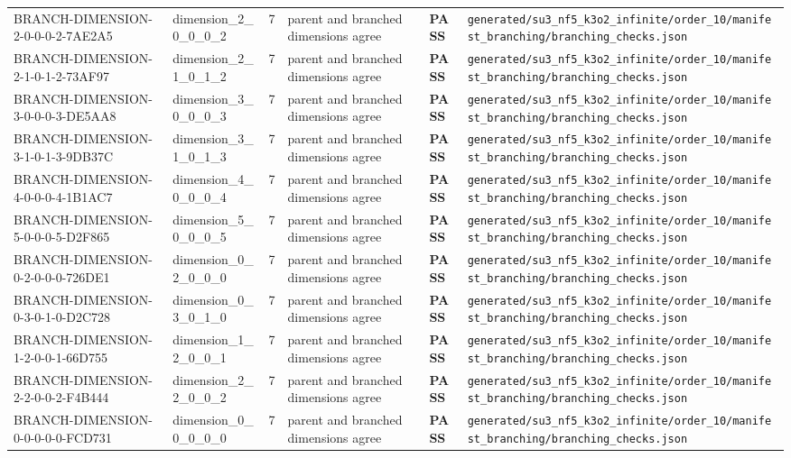 \documentclass[11pt]{article}
\newcommand{\Pass}{\textcolor{green!50!black}{\textbf{PASS}}}
\newcommand{\RawPath}[1]{\texttt{#1}}
\begin{document}
\begin{longtable}{p{3cm}p{2.5cm}r p{3cm}l p{2cm}}
BRANCH-DIMENSION-2-0-0-0-2-7AE2A5 & dimension\_2\_0\_0\_0\_2 & 7 & parent and branched dimensions agree & \Pass & \RawPath{generated/su3\_nf5\_k3o2\_infinite/order\_10/manifest\_branching/branching\_checks.json}\\
BRANCH-DIMENSION-2-1-0-1-2-73AF97 & dimension\_2\_1\_0\_1\_2 & 7 & parent and branched dimensions agree & \Pass & \RawPath{generated/su3\_nf5\_k3o2\_infinite/order\_10/manifest\_branching/branching\_checks.json}\\
BRANCH-DIMENSION-3-0-0-0-3-DE5AA8 & dimension\_3\_0\_0\_0\_3 & 7 & parent and branched dimensions agree & \Pass & \RawPath{generated/su3\_nf5\_k3o2\_infinite/order\_10/manifest\_branching/branching\_checks.json}\\
BRANCH-DIMENSION-3-1-0-1-3-9DB37C & dimension\_3\_1\_0\_1\_3 & 7 & parent and branched dimensions agree & \Pass & \RawPath{generated/su3\_nf5\_k3o2\_infinite/order\_10/manifest\_branching/branching\_checks.json}\\
BRANCH-DIMENSION-4-0-0-0-4-1B1AC7 & dimension\_4\_0\_0\_0\_4 & 7 & parent and branched dimensions agree & \Pass & \RawPath{generated/su3\_nf5\_k3o2\_infinite/order\_10/manifest\_branching/branching\_checks.json}\\
BRANCH-DIMENSION-5-0-0-0-5-D2F865 & dimension\_5\_0\_0\_0\_5 & 7 & parent and branched dimensions agree & \Pass & \RawPath{generated/su3\_nf5\_k3o2\_infinite/order\_10/manifest\_branching/branching\_checks.json}\\
BRANCH-DIMENSION-0-2-0-0-0-726DE1 & dimension\_0\_2\_0\_0\_0 & 7 & parent and branched dimensions agree & \Pass & \RawPath{generated/su3\_nf5\_k3o2\_infinite/order\_10/manifest\_branching/branching\_checks.json}\\
BRANCH-DIMENSION-0-3-0-1-0-D2C728 & dimension\_0\_3\_0\_1\_0 & 7 & parent and branched dimensions agree & \Pass & \RawPath{generated/su3\_nf5\_k3o2\_infinite/order\_10/manifest\_branching/branching\_checks.json}\\
BRANCH-DIMENSION-1-2-0-0-1-66D755 & dimension\_1\_2\_0\_0\_1 & 7 & parent and branched dimensions agree & \Pass & \RawPath{generated/su3\_nf5\_k3o2\_infinite/order\_10/manifest\_branching/branching\_checks.json}\\
BRANCH-DIMENSION-2-2-0-0-2-F4B444 & dimension\_2\_2\_0\_0\_2 & 7 & parent and branched dimensions agree & \Pass & \RawPath{generated/su3\_nf5\_k3o2\_infinite/order\_10/manifest\_branching/branching\_checks.json}\\
BRANCH-DIMENSION-0-0-0-0-0-FCD731 & dimension\_0\_0\_0\_0\_0 & 7 & parent and branched dimensions agree & \Pass & \RawPath{generated/su3\_nf5\_k3o2\_infinite/order\_10/manifest\_branching/branching\_checks.json}\\

\end{longtable}
\end{document}

